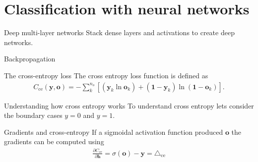 \documentclass[notes]{beamer}
\begin{document}
    \section{Classification with neural networks}

    \begin{frame}{Deep multi-layer networks}
      Stack dense layers and activations to create deep networks. \\
      \begin{figure}
         
      \end{figure}
    \end{frame}

    \begin{frame}{Backpropagation}
      \begin{figure}
         
      \end{figure}
    \end{frame}

    \begin{frame}{The cross-entropy loss}
      The cross entropy loss function is defined as \cite{nielsen2015neural, bishop2006pattern}
      \begin{align} \label{eq:ce}
       C_{\text{ce}}(\mathbf{y}, \mathbf{o}) = -\sum_k^{n_o} [( \mathbf{y}_k  \ln \mathbf{o}_k) 
                                  + (\mathbf{1} - \mathbf{y}_k)
                                     \ln(\mathbf{1} - \mathbf{o}_k)].
      \end{align}
    \end{frame}

    \begin{frame}{Understanding how cross entropy works}
      To understand cross entropy lets consider the boundary cases $y=0$ and $y=1$.
      \begin{figure}
        
        
      \end{figure}
    \end{frame}

    \begin{frame}{Gradients and cross-entropy}
      If a sigmoidal activation function produced $\mathbf{o}$ the gradients can be computed using ~\cite{nielsen2015neural,bishop2006pattern}
      \begin{align} 
         \frac{\partial C_{ce}}{\partial \mathbf{h}} 
         = \sigma(\mathbf{o}) - \mathbf{y} = \triangle_{\text{ce}}
      \end{align}
    \end{frame}
\end{document}
